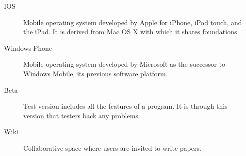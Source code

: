 \documentclass {life-en}
\begin{document}
\begin{description}
\item [IOS]
Mobile operating system developed by Apple for iPhone, iPod touch, and the iPad. It is derived from Mac OS X with which it shares foundations.

\item [Windows Phone]
Mobile operating system developed by Microsoft as the successor to Windows Mobile, its previous software platform.

\item [Beta]
Test version includes all the features of a program. It is through this version that testers back any problems.

\item [Wiki]
Collaborative space where users are invited to write papers.


\end{description}
\end{document}
